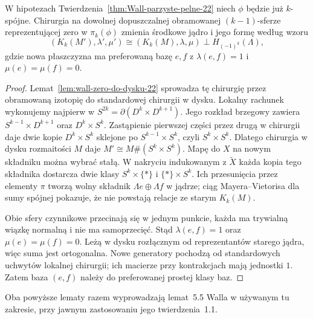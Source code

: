 \begin{lemat}
\label{lem:wall-lokalna-stabilizacja-22}
W hipotezach Twierdzenia~\ref{thm:Wall-parzyste-pelne-22}
niech $\phi$ będzie już $k$-spójne. Chirurgia na
dowolnej dopuszczalnej obramowanej $(k-1)$-sferze
reprezentującej zero w $\pi_k(\phi)$ zmienia środkowe
jądro i jego formę według wzoru
\[
 (K_k(M'),\lambda',\mu')
 \cong (K_k(M),\lambda,\mu)
       \perp H_{(-1)^k}(\Lambda),
\]
gdzie nowa płaszczyzna ma preferowaną bazę
$e,f$ z $\lambda(e,f)=1$ i
$\mu(e)=\mu(f)=0$.
\end{lemat}
\begin{proof}
Lemat~\ref{lem:wall-zero-do-dysku-22} sprowadza
tę chirurgię przez obramowaną izotopię do
standardowej chirurgii w dysku.
Lokalny rachunek wykonujemy najpierw w
$S^{2k}=\partial(D^k\times D^{k+1})$.
Jego rozkład brzegowy zawiera
$S^{k-1}\times D^{k+1}$ oraz
$D^k\times S^k$. Zastąpienie pierwszej
części przez drugą w chirurgii daje
dwie kopie $D^k\times S^k$ sklejone po
$S^{k-1}\times S^k$, czyli
$S^k\times S^k$. Dlatego chirurgia w
dysku rozmaitości $M$ daje
$M'\cong M\#(S^k\times S^k)$.
Mapę do $X$ na nowym składniku można
wybrać stałą. W nakryciu indukowanym
z $\widetilde X$ każda kopia tego
składnika dostarcza dwie klasy
$S^k\times\{*\}$ i $\{*\}\times S^k$.
Ich przesunięcia przez elementy $\pi$
tworzą wolny składnik
$\Lambda e\oplus\Lambda f$ w jądrze;
ciąg Mayera--Vietorisa dla sumy
spójnej pokazuje, że nie powstają
relacje ze starym $K_k(M)$.

Obie sfery czynnikowe przecinają się
w jednym punkcie, każda ma trywialną
wiązkę normalną i nie ma samoprzecięć.
Stąd $\lambda(e,f)=1$ oraz
$\mu(e)=\mu(f)=0$. Leżą w dysku
rozłącznym od reprezentantów starego
jądra, więc suma jest ortogonalna.
Nowe generatory pochodzą od
standardowych uchwytów lokalnej
chirurgii; ich macierze przy
kontrakcjach mają jednostki $1$.
Zatem baza $(e,f)$ należy do
preferowanej prostej klasy baz.
\end{proof}

Oba powyższe lematy razem wyprowadzają
lemat~5.5 Walla w używanym tu zakresie,
przy jawnym zastosowaniu jego twierdzenia~1.1.

